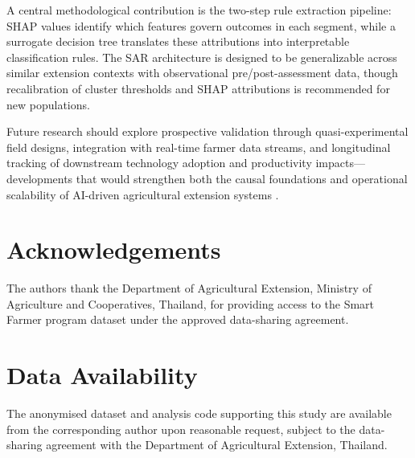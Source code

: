 \documentclass[3p,twocolumn,authoryear]{elsarticle}
\begin{document}
A central methodological contribution is the two-step rule extraction
pipeline: SHAP values identify which features govern outcomes in each
segment, while a surrogate decision tree translates these attributions
into interpretable classification rules.
The SAR architecture is designed to be generalizable across similar
extension contexts with observational pre/post-assessment data, though
recalibration of cluster thresholds and SHAP attributions is recommended
for new populations.

Future research should explore prospective validation through
quasi-experimental field designs, integration with real-time farmer data
streams, and longitudinal tracking of downstream technology adoption and
productivity impacts---developments that would strengthen both the causal
foundations and operational scalability of AI-driven agricultural
extension systems \citep{yang2025,zhang2026}.

\section*{Acknowledgements}

The authors thank the Department of Agricultural Extension, Ministry of
Agriculture and Cooperatives, Thailand, for providing access to the
Smart Farmer program dataset under the approved data-sharing agreement.

\section*{Data Availability}

The anonymised dataset and analysis code supporting this study are
available from the corresponding author upon reasonable request, subject
to the data-sharing agreement with the Department of Agricultural
Extension, Thailand.
\end{document}
